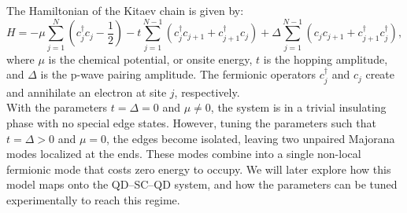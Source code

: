 \documentclass[11pt, letterpaper, titlepage]{article}
\begin{document}
The Hamiltonian of the Kitaev chain is given by:
\begin{equation}
H = -\mu \sum_{j=1}^{N} \left(c_j^\dagger c_j - \frac{1}{2}\right)
- t \sum_{j=1}^{N-1} \left(c_j^\dagger c_{j+1} + c_{j+1}^\dagger c_j\right)
+ \Delta \sum_{j=1}^{N-1} \left(c_j c_{j+1} + c_{j+1}^\dagger c_j^\dagger\right),
\label{eq:kitaev_ham}
\end{equation}
where $μ$ is the chemical potential, or onsite energy, $t$ is the hopping amplitude, and $Δ$ is the p-wave pairing amplitude. The fermionic operators $c_j^\dagger$ and $c_j$ create and annihilate an electron at site $j$, respectively.\\
With the parameters $t=Δ=0$ and $μ ≠ 0$, the system is in a trivial insulating phase with no special edge states. However, tuning the parameters such that $t = Δ > 0$ and $μ = 0$, the edges become isolated, leaving two unpaired Majorana modes localized at the ends. These modes combine into a single non-local fermionic mode that costs zero energy to occupy. We will later explore how this model maps onto the QD–SC–QD system, and how the parameters can be tuned experimentally to reach this regime. 
\end{document}
